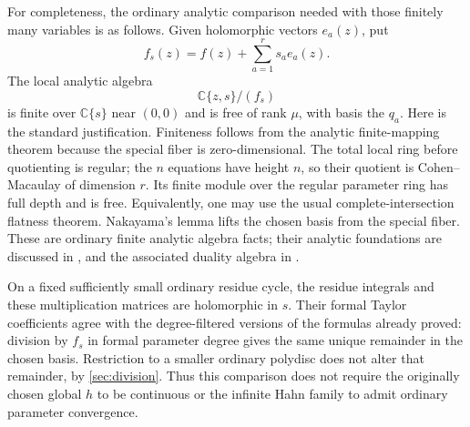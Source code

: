 \documentclass[11pt,letterpaper]{article}
\theoremstyle{definition}
\theoremstyle{remark}
\newcommand{\C}{\mathbb C}
\numberwithin{equation}{section}
\begin{document}
For completeness, the ordinary analytic comparison needed with those finitely many variables is as follows. Given holomorphic vectors $e_a(z)$, put
\[
 f_s(z)=f(z)+\sum_{a=1}^r s_ae_a(z).
\]
The local analytic algebra
\[
 \C\{z,s\}/(f_s)
\]
is finite over $\C\{s\}$ near $(0,0)$ and is free of rank $\mu$, with basis the $q_a$. Here is the standard justification. Finiteness follows from the analytic finite-mapping theorem because the special fiber is zero-dimensional. The total local ring before quotienting is regular; the $n$ equations have height $n$, so their quotient is Cohen--Macaulay of dimension $r$. Its finite module over the regular parameter ring has full depth and is free. Equivalently, one may use the usual complete-intersection flatness theorem. Nakayama's lemma lifts the chosen basis from the special fiber. These are ordinary finite analytic algebra facts; their analytic foundations are discussed in \cite{Demailly}, and the associated duality algebra in \cite{Kunz}.

On a fixed sufficiently small ordinary residue cycle, the residue integrals and these multiplication matrices are holomorphic in $s$. Their formal Taylor coefficients agree with the degree-filtered versions of the formulas already proved: division by $f_s$ in formal parameter degree gives the same unique remainder in the chosen basis. Restriction to a smaller ordinary polydisc does not alter that remainder, by \cref{sec:division}. Thus this comparison does not require the originally chosen global $h$ to be continuous or the infinite Hahn family to admit ordinary parameter convergence.
\end{document}
